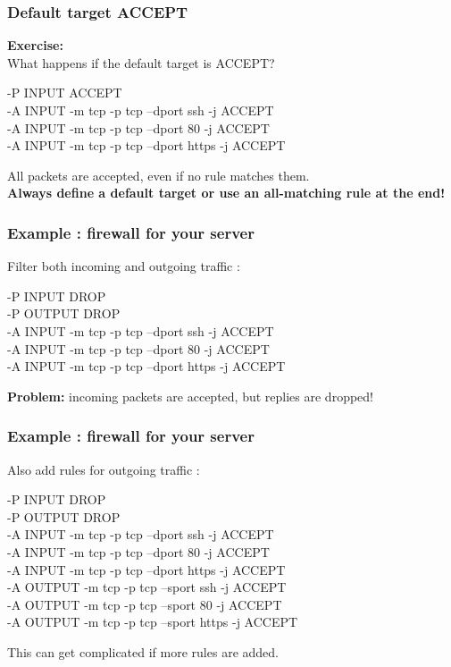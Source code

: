 \documentclass[14pt]{beamer}
\begin{document}
  \begin{frame}
    \frametitle{Default target ACCEPT}
    \textbf{Exercise:}\\
    What happens if the default target is ACCEPT?
    \begin{example}
      \small{-P INPUT ACCEPT\\
      -A INPUT -m tcp -p tcp --dport ssh -j ACCEPT\\
      -A INPUT -m tcp -p tcp --dport 80 -j ACCEPT\\
      -A INPUT -m tcp -p tcp --dport https -j ACCEPT}
    \end{example}
    \pause
    All packets are accepted, even if no rule matches them.\\
    \pause
    \textbf{Always define a default target or use an all-matching rule at the end!}
  \end{frame}
  \begin{frame}
    \frametitle{Example : firewall for your server}
    Filter both incoming and outgoing traffic :
    \begin{example}
      \small{-P INPUT DROP\\
      -P OUTPUT DROP\\
      -A INPUT -m tcp -p tcp --dport ssh -j ACCEPT\\
      -A INPUT -m tcp -p tcp --dport 80 -j ACCEPT\\
      -A INPUT -m tcp -p tcp --dport https -j ACCEPT}
    \end{example}
    \pause
    \textbf{Problem:} incoming packets are accepted, but replies are dropped!
  \end{frame}
  \begin{frame}
    \frametitle{Example : firewall for your server}
    Also add rules for outgoing traffic :
    \begin{example}
      \small{-P INPUT DROP\\
      -P OUTPUT DROP\\
      -A INPUT -m tcp -p tcp --dport ssh -j ACCEPT\\
      -A INPUT -m tcp -p tcp --dport 80 -j ACCEPT\\
      -A INPUT -m tcp -p tcp --dport https -j ACCEPT\\
      -A OUTPUT -m tcp -p tcp --sport ssh -j ACCEPT\\
      -A OUTPUT -m tcp -p tcp --sport 80 -j ACCEPT\\
      -A OUTPUT -m tcp -p tcp --sport https -j ACCEPT}
    \end{example}
    \pause
    This can get complicated if more rules are added.
  \end{frame}
\end{document}

